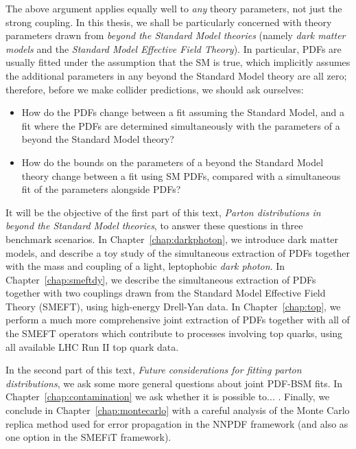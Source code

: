 \documentclass[withindex,glossary]{cam-thesis}
\begin{document}
\noindent The above argument applies equally well to \textit{any} theory parameters, not just the strong coupling. In this thesis, we shall be particularly concerned with theory parameters drawn from \textit{beyond the Standard Model theories} (namely \textit{dark matter models} and the \textit{Standard Model Effective Field Theory}). In particular, PDFs are usually fitted under the assumption that the SM is true, which implicitly assumes the additional parameters in any beyond the Standard Model theory are all zero; therefore, before we make collider predictions, we should ask ourselves:
\begin{itemize}
\item How do the PDFs change between a fit assuming the Standard Model, and a fit where the PDFs are determined simultaneously with the parameters of a beyond the Standard Model theory?
\item How do the bounds on the parameters of a beyond the Standard Model theory change between a fit using SM PDFs, compared with a simultaneous fit of the parameters alongside PDFs?
\end{itemize}

It will be the objective of the first part of this text, \textit{Parton distributions in beyond the Standard Model theories}, to answer these questions in three benchmark scenarios. In Chapter~\ref{chap:darkphoton}, we introduce dark matter models, and describe a toy study of the simultaneous extraction of PDFs together with the mass and coupling of a light, leptophobic \textit{dark photon}. In Chapter~\ref{chap:smeftdy}, we describe the simultaneous extraction of PDFs together with two couplings drawn from the Standard Model Effective Field Theory (SMEFT), using high-energy Drell-Yan data. In Chapter~\ref{chap:top}, we perform a much more comprehensive joint extraction of PDFs together with all of the SMEFT operators which contribute to processes involving top quarks, using all available LHC Run II top quark data.

In the second part of this text, \textit{Future considerations for fitting parton distributions}, we ask some more general questions about joint PDF-BSM fits. In Chapter~\ref{chap:contamination} we ask whether it is possible to... . Finally, we conclude in Chapter~\ref{chap:montecarlo} with a careful analysis of the Monte Carlo replica method used for error propagation in the NNPDF framework (and also as one option in the SMEFiT framework). 
\end{document}
